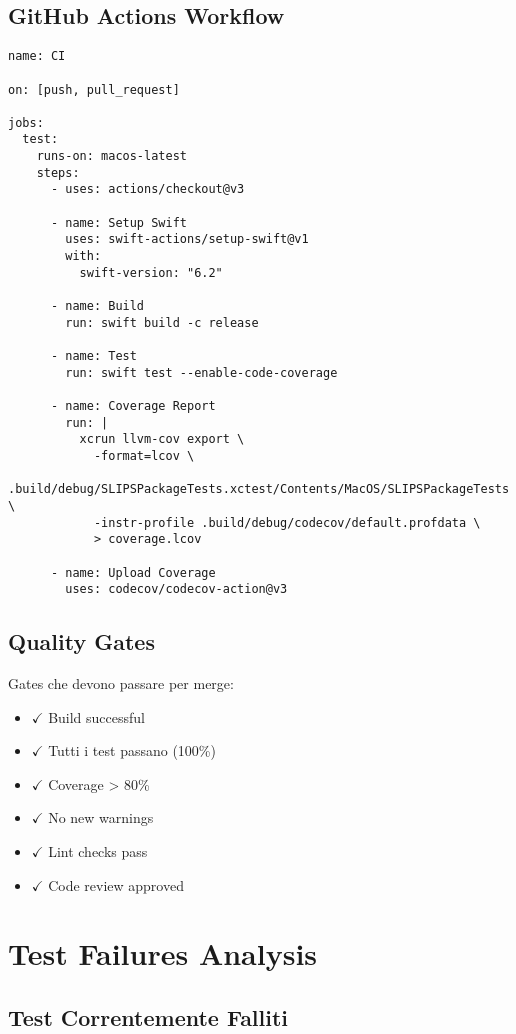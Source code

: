\subsection{GitHub Actions Workflow}

\begin{lstlisting}
name: CI

on: [push, pull_request]

jobs:
  test:
    runs-on: macos-latest
    steps:
      - uses: actions/checkout@v3
      
      - name: Setup Swift
        uses: swift-actions/setup-swift@v1
        with:
          swift-version: "6.2"
      
      - name: Build
        run: swift build -c release
      
      - name: Test
        run: swift test --enable-code-coverage
      
      - name: Coverage Report
        run: |
          xcrun llvm-cov export \
            -format=lcov \
            .build/debug/SLIPSPackageTests.xctest/Contents/MacOS/SLIPSPackageTests \
            -instr-profile .build/debug/codecov/default.profdata \
            > coverage.lcov
      
      - name: Upload Coverage
        uses: codecov/codecov-action@v3
\end{lstlisting}

\subsection{Quality Gates}

Gates che devono passare per merge:

\begin{itemize}
\item $\checkmark$ Build successful
\item $\checkmark$ Tutti i test passano (100\%)
\item $\checkmark$ Coverage > 80\%
\item $\checkmark$ No new warnings
\item $\checkmark$ Lint checks pass
\item $\checkmark$ Code review approved
\end{itemize}

\section{Test Failures Analysis}

\subsection{Test Correntemente Falliti}

